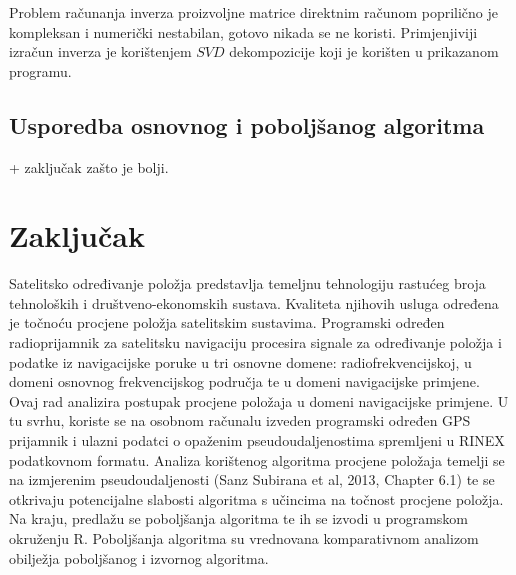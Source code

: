 \documentclass[a4paper,twoside,12pt]{memoir} %
\begin{document}
Problem računanja inverza proizvoljne matrice direktnim računom poprilično je kompleksan i numerički nestabilan, gotovo nikada se ne koristi. 
Primjenjiviji izračun inverza je korištenjem $SVD$ dekompozicije koji je korišten u prikazanom programu.


\subsection{Usporedba osnovnog i poboljšanog algoritma} + zaključak zašto je bolji.

\section{Zaključak}






\pagestyle{empty} %


\begin{sazetak}
Satelitsko određivanje položja predstavlja temeljnu
tehnologiju rastućeg broja tehnoloških i društveno-ekonomskih sustava.
Kvaliteta njihovih
usluga određena je točnoću procjene položja
satelitskim sustavima.
Programski određen radioprijamnik za satelitsku navigaciju
procesira signale za određivanje položja i podatke
iz navigacijske poruke
u tri osnovne domene: radiofrekvencijskoj, u domeni osnovnog frekvencijskog
područja te u domeni navigacijske primjene.
Ovaj rad analizira postupak procjene položaja
u domeni navigacijske primjene. U tu svrhu, koriste se na osobnom računalu
izveden programski određen GPS prijamnik i ulazni podatci
o opaženim pseudoudaljenostima spremljeni
u RINEX podatkovnom formatu.
Analiza korištenog algoritma procjene položaja
temelji se na izmjerenim pseudoudaljenosti (Sanz Subirana et al, 2013, Chapter 6.1)
te se otkrivaju potencijalne slabosti algoritma
s učincima na točnost procjene položja. Na kraju, predlažu se poboljšanja
algoritma te ih se izvodi u programskom okruženju R. 
Poboljšanja algoritma su vrednovana komparativnom analizom obilježja
poboljšanog i izvornog algoritma.
\end{sazetak}
\end{document}
